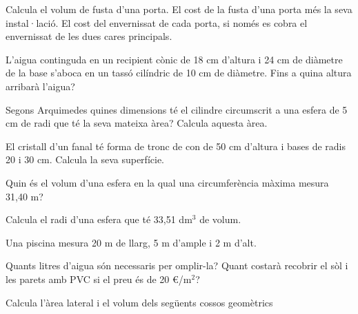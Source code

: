 \begin{activitats}
\begin{mylist}
\begin{tasks}
	\task  Calcula el volum de fusta d'una porta. 
	\task  El cost de la fusta d'una porta més la seva instal·lació. 
	\task  El cost del envernissat de cada porta, si només es cobra el envernissat de les dues cares principals. 
\end{tasks}


\exer  L'aigua continguda en un recipient cònic de 18 cm d'altura i 24 cm de diàmetre de la base s'aboca en un tassó cilíndric de 10 cm de diàmetre. Fins a quina altura arribarà l'aigua?


\exer  Segons Arquimedes quines dimensions té el cilindre circumscrit a una esfera de 5 cm de radi que té la seva mateixa àrea? Calcula aquesta àrea.


\exer El cristall d'un fanal té forma de tronc de con de 50 cm d'altura i bases de radis 20 i 30 cm. Calcula la seva superfície.

\exer  Quin és el volum d'una esfera en la qual una circumferència màxima mesura 31,40 m?


\exer  Calcula el radi d'una esfera que té 33,51 dm${}^{3}$ de volum.
 
 
\exer  Una piscina mesura 20 m de llarg, 5 m d'ample i 2 m d'alt.

\begin{tasks}
	\task Quants litres d'aigua són necessaris per omplir-la?
	\task Quant costarà recobrir el sòl i les parets amb PVC si el preu és de 20 \euro{}/m${}^{2}$?
\end{tasks}

\answers[cols=1]{[200 m$^3$=200\,000 litres, 4000 \euro{} ]}

\exer[1]  Calcula l'àrea lateral i el volum dels següents cossos geomètrics
\answers[cols=1]{[$A=480$ cm$^2$ i $V=448$ cm$^3$, $A=226.19$ cm$^2$ i $V=282.743$ cm$^3$, $A=$depèn de l'inclinació i $V=125.66$ cm$^3$, $A=277.24$ cm$^2$ i $V=368.61$ cm$^3$]}


\end{mylist}
\end{activitats}
